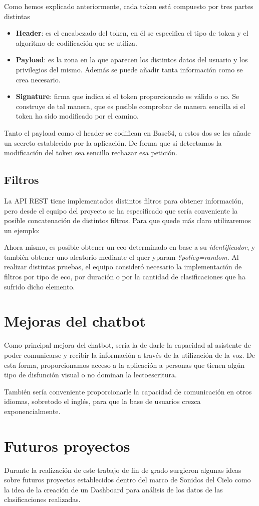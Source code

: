 Como hemos explicado anteriormente, cada token está compuesto por tres partes distintas

\begin{itemize}
    \item \textbf{Header}: es el encabezado del token, en él se especifica el tipo de token y el algoritmo de codificación que se utiliza.
    \item \textbf{Payload}: es la zona en la que aparecen los distintos datos del usuario y los privilegios del mismo. Además se puede añadir tanta información como se crea necesario.
    \item \textbf{Signature}: firma que indica si el token proporcionado es válido o no. Se construye de tal manera, que es posible comprobar de manera sencilla si el token ha sido modificado por el camino.
\end{itemize}

Tanto el payload como el header se codifican en Base64, a estos dos se les añade un secreto establecido por la aplicación. De forma que si detectamos la modificación del token sea sencillo rechazar esa petición.

\subsection{Filtros}

La API REST tiene implementados distintos filtros para obtener información, pero desde el equipo del proyecto se ha especificado que sería conveniente la posible concatenación de distintos filtros. 
Para que quede más claro utilizaremos un ejemplo:

Ahora mismo, es posible obtener un eco determinado en base a su \textit{identificador}, y también obtener uno aleatorio mediante el quer yparam \textit{?policy=random}. 
Al realizar distintas pruebas, el equipo consideró necesario la implementación de filtros por tipo de eco, por duración o por la cantidad de clasificaciones que ha sufrido dicho elemento.

\section{Mejoras del chatbot}

Como principal mejora del chatbot, sería la de darle la capacidad al asistente de poder comunicarse y recibir la información a través de la utilización de la voz. De esta forma, proporcionamos acceso a la aplicación a personas que tienen algún tipo de disfunción visual o no dominan la lectoescritura.

También sería conveniente proporcionarle la capacidad de comunicación en otros idiomas, sobretodo el inglés, para que la base de usuarios crezca exponencialmente.

\section{Futuros proyectos}

Durante la realización de este trabajo de fin de grado surgieron algunas ideas sobre futuros proyectos establecidos dentro del marco de Sonidos del Cielo como la idea de la creación de un Dashboard para análisis de los datos de las clasificaciones realizadas.